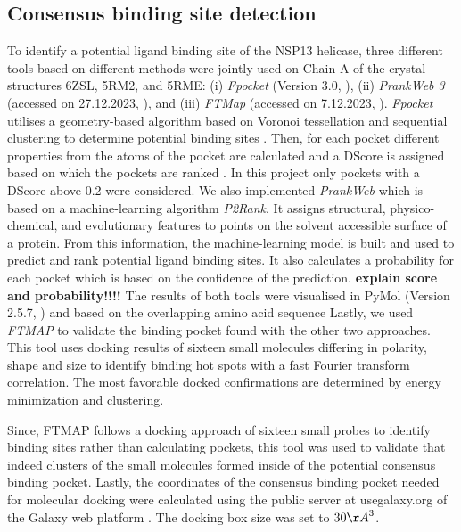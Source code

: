 \documentclass[11pt, letterpaper, titlepage]{article}
\renewcommand{\cite}{\parencite}
\begin{document}
\subsection{Consensus binding site detection}
To identify a potential ligand binding site of the NSP13 helicase, three different tools based on different methods were jointly used on Chain A of the crystal structures 6ZSL, 5RM2, and 5RME: (i) \textit{Fpocket} (Version 3.0, \textcite{package_Fpocket}), (ii) \textit{PrankWeb 3} (accessed on 27.12.2023, \textcite{package_P2Rank, package_PrankWeb, package_PrankWeb3}), and (iii) \textit{FTMap} (accessed on 7.12.2023, \textcite{package_FTMAP}).  
\textit{Fpocket} utilises a geometry-based algorithm based on Voronoi tessellation and sequential clustering to determine potential binding sites \cite{package_Fpocket}. Then, for each pocket different properties from the atoms of the pocket are calculated and a \ac{DScore} is assigned based on which the pockets are ranked \cite{package_Fpocket}. In this project only pockets with a \ac{DScore} above 0.2 were considered. 
We also implemented \textit{PrankWeb} \cite{package_P2Rank, package_PrankWeb, package_PrankWeb3} which is based on a machine-learning algorithm \textit{P2Rank}. It assigns structural, physico-chemical, and evolutionary features to points on the solvent accessible surface of a protein. From this information, the machine-learning model is built and used to predict and rank potential ligand binding sites. It also calculates a probability for each pocket which is based on the confidence of the prediction. \textbf{explain score and probability!!!!}
The results of both tools were visualised in PyMol (Version 2.5.7, \textcite{PyMol_endnote}) and based on the overlapping amino acid sequence 
Lastly, we used \textit{FTMAP} \cite{package_FTMAP} to validate the binding pocket found with the other two approaches. This tool uses docking results of sixteen small molecules differing in polarity, shape and size to identify binding hot spots with a fast Fourier transform correlation. The most favorable docked confirmations are determined by energy minimization and clustering. 


Since, FTMAP follows a docking approach of sixteen small probes to identify binding sites rather than calculating pockets, this tool was used to validate that indeed clusters of the small molecules formed inside of the potential consensus binding pocket. 
Lastly, the coordinates of the consensus binding pocket needed for molecular docking were calculated using the public server at usegalaxy.org of the Galaxy web platform \cite{galaxy}. The docking box size was set to $30 {\AA}^3$. 
\end{document}
